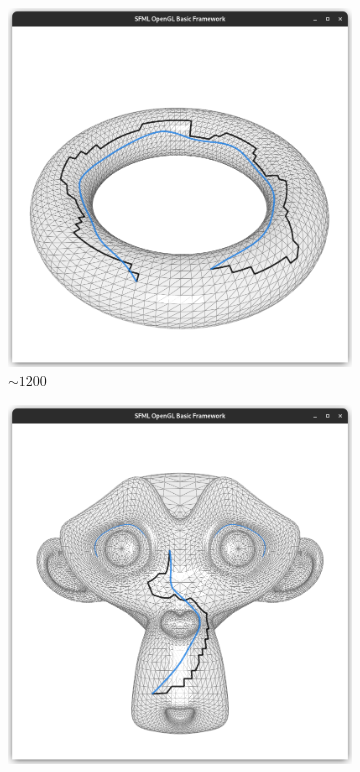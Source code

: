 \documentclass{stdlocal}
\begin{document}
\begin{figure}
  \centering
  \begin{subfigure}[b]{0.24\linewidth}
    \centering
    \includegraphics[width=\linewidth,trim={25px 20 25 50},clip]{images/torus-smooth-0.5.png}
    \caption{$\sim 1200$}
  \end{subfigure}
  \begin{subfigure}[b]{0.24\linewidth}
    \centering
    \includegraphics[width=\linewidth,trim={25px 20 25 50},clip]{images/suzanne-smooth-0.5.png}

\end{subfigure}
\end{figure}
\end{document}
